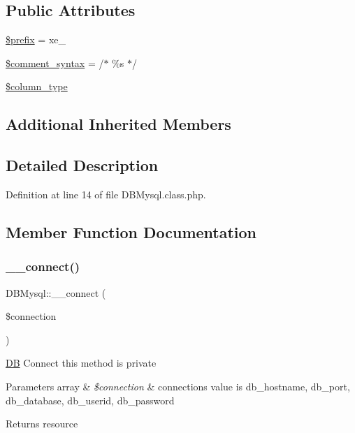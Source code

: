 \subsection*{Public Attributes}
\begin{DoxyCompactItemize}
\item 
\hyperlink{classDBMysql_ac95b2047c4c75730e0533be0cccd19d9}{\$prefix} = \textquotesingle{}xe\+\_\+\textquotesingle{}
\item 
\hyperlink{classDBMysql_a2c00f6e29c9e4fc4a532f806cf4313c2}{\$comment\+\_\+syntax} = \textquotesingle{}/$\ast$ \%s $\ast$/\textquotesingle{}
\item 
\hyperlink{classDBMysql_aa93c8f5f14304a16864a0708a3ba41b0}{\$column\+\_\+type}
\end{DoxyCompactItemize}
\subsection*{Additional Inherited Members}


\subsection{Detailed Description}


Definition at line 14 of file D\+B\+Mysql.\+class.\+php.



\subsection{Member Function Documentation}
\mbox{\label{classDBMysql_ad11061c47d57c2f346947e0789ecb46b}} 
\subsubsection{\texorpdfstring{\+\_\+\+\_\+connect()}{\_\_connect()}}
{\footnotesize\ttfamily D\+B\+Mysql\+::\+\_\+\+\_\+connect (\begin{DoxyParamCaption}\item[{}]{\$connection }\end{DoxyParamCaption})}

\hyperlink{classDB}{DB} Connect this method is private 
\begin{DoxyParams}[1]{Parameters}
array & {\em \$connection} & connection\textquotesingle{}s value is db\+\_\+hostname, db\+\_\+port, db\+\_\+database, db\+\_\+userid, db\+\_\+password \\
\hline
\end{DoxyParams}
\begin{DoxyReturn}{Returns}
resource 
\end{DoxyReturn}


